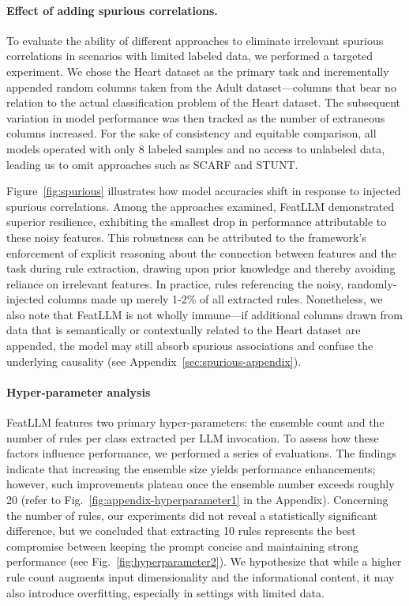 {\paragraph{Effect of adding spurious correlations.} To evaluate the ability of different approaches to eliminate irrelevant spurious correlations in scenarios with limited labeled data, we performed a targeted experiment. We chose the Heart dataset as the primary task and incrementally appended random columns taken from the Adult dataset—columns that bear no relation to the actual classification problem of the Heart dataset. The subsequent variation in model performance was then tracked as the number of extraneous columns increased. For the sake of consistency and equitable comparison, all models operated with only 8 labeled samples and no access to unlabeled data, leading us to omit approaches such as SCARF and STUNT.

Figure~\ref{fig:spurious} illustrates how model accuracies shift in response to injected spurious correlations. Among the approaches examined, \textsf{FeatLLM} demonstrated superior resilience, exhibiting the smallest drop in performance attributable to these noisy features. This robustness can be attributed to the framework’s enforcement of explicit reasoning about the connection between features and the task during rule extraction, drawing upon prior knowledge and thereby avoiding reliance on irrelevant features. In practice, rules referencing the noisy, randomly-injected columns made up merely 1-2\% of all extracted rules. Nonetheless, we also note that \textsf{FeatLLM} is not wholly immune—if additional columns drawn from data that is semantically or contextually related to the Heart dataset are appended, the model may still absorb spurious associations and confuse the underlying causality (see Appendix~\ref{sec:spurious-appendix}).

\vspace*{-0.12in}
\paragraph{Hyper-parameter analysis}
\textsf{FeatLLM} features two primary hyper-parameters: the ensemble count and the number of rules per class extracted per LLM invocation. To assess how these factors influence performance, we performed a series of evaluations. The findings indicate that increasing the ensemble size yields performance enhancements; however, such improvements plateau once the ensemble number exceeds roughly 20 (refer to Fig.~\ref{fig:appendix-hyperparameter1} in the Appendix). Concerning the number of rules, our experiments did not reveal a statistically significant difference, but we concluded that extracting 10 rules represents the best compromise between keeping the prompt concise and maintaining strong performance (see Fig.~\ref{fig:hyperparameter2}). We hypothesize that while a higher rule count augments input dimensionality and the informational content, it may also introduce overfitting, especially in settings with limited data.

}
